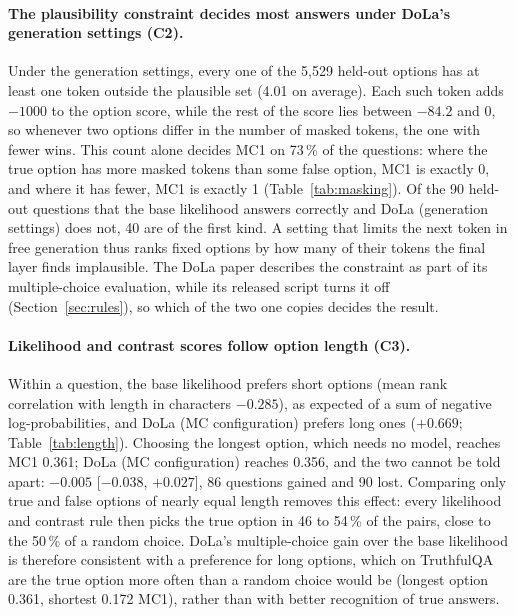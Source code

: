 \documentclass[11pt]{article}
\newcommand{\cha}[1]{\textsf{C#1}}
\begin{document}
\paragraph{The plausibility constraint decides most answers under DoLa's generation settings (\cha2).}
Under the generation settings, every one of the 5,529 held-out options has at least one token outside the plausible
set (4.01 on average). Each such token adds $-1000$ to the option score, while the rest of the score lies between
$-84.2$ and $0$, so whenever two options differ in the number of masked tokens, the one with fewer wins. This
count alone decides MC1 on 73\,\% of the questions: where the true option has more masked tokens than some false
option, MC1 is exactly 0, and where it has fewer, MC1 is exactly 1 (Table~\ref{tab:masking}). Of the 90 held-out
questions that the base likelihood answers correctly and DoLa (generation settings) does not, 40 are of the first
kind. A setting that limits the next token in free generation thus ranks fixed options by how many of their tokens
the final layer finds implausible. The DoLa paper describes the constraint as part of its multiple-choice
evaluation, while its released script turns it off (Section~\ref{sec:rules}), so which of the two one copies
decides the result.

\begin{table}[t]
\centering\small\setlength{\tabcolsep}{4pt}
\caption{Held-out questions grouped by the number of option tokens the plausibility constraint masks under DoLa's
generation settings: the true MC1 option against the false option with the fewest masked tokens. MC1 per group for
three rules.}
\label{tab:masking}
\end{table}

\paragraph{Likelihood and contrast scores follow option length (\cha3).}
Within a question, the base likelihood prefers short options (mean rank correlation with length in characters
$-0.285$), as expected of a sum of negative log-probabilities, and DoLa (MC configuration) prefers long ones
($+0.669$; Table~\ref{tab:length}). Choosing the
longest option, which needs no model, reaches MC1 0.361; DoLa (MC configuration) reaches 0.356, and the two cannot
be told apart: $-0.005$ [$-0.038$, $+0.027$], 86 questions gained and 90 lost. Comparing only true and false options
of nearly equal length removes this effect: every likelihood and contrast rule then picks the true option in 46 to
54\,\% of the pairs, close to the 50\,\% of a random choice. DoLa's multiple-choice gain over the base likelihood is
therefore consistent with a preference for long options, which on TruthfulQA are the true option more often than a
random choice would be (longest option 0.361, shortest 0.172 MC1), rather than with better recognition of true
answers.
\end{document}
